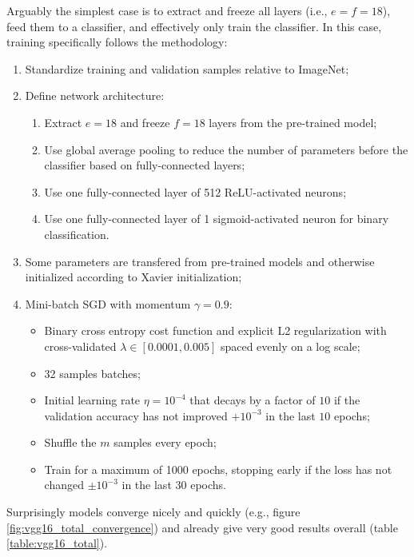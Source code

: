 Arguably the simplest case is to extract and freeze all layers (i.e., $e = f = 18$), feed them to a classifier, and effectively only train the classifier. In this case, training specifically follows the methodology:

\begin{enumerate}
    \item Standardize training and validation samples relative to ImageNet;
    \item Define network architecture:
        \begin{enumerate}
            \item Extract $e = 18$ and freeze $f = 18$ layers from the pre-trained model;
            \item Use global average pooling to reduce the number of parameters before the classifier based on fully-connected layers;
            \item Use one fully-connected layer of 512 ReLU-activated neurons;
            \item Use one fully-connected layer of 1 sigmoid-activated neuron for binary classification.
        \end{enumerate}
    \item Some parameters are transfered from pre-trained models and otherwise initialized according to Xavier initialization;
    \item Mini-batch \ac{SGD} with momentum $\gamma = 0.9$:
        \begin{itemize}
            \item Binary cross entropy cost function and explicit L2 regularization with cross-validated $\lambda \in [0.0001, 0.005]$ spaced evenly on a log scale;
            \item 32 samples batches;
            \item Initial learning rate $\eta = 10^{-4}$ that decays by a factor of $10$ if the validation accuracy has not improved $+10^{-3}$ in the last $10$ epochs;
            \item Shuffle the $m$ samples every epoch;
            \item Train for a maximum of 1000 epochs, stopping early if the loss has not changed $\pm 10^{-3}$ in the last $30$ epochs.
        \end{itemize}
\end{enumerate}

Surprisingly models converge nicely and quickly (e.g., figure \ref{fig:vgg16_total_convergence}) and already give very good results overall (table \ref{table:vgg16_total}).

